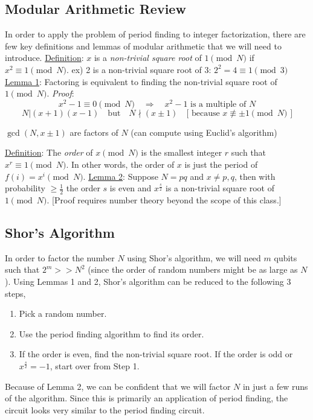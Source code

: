\documentclass[11pt]{article} %
\begin{document}
\subsection{Modular Arithmetic Review}
In order to apply the problem of period finding to integer factorization, there are few key definitions and lemmas of modular arithmetic that we will need to introduce.
\newline\newline
\underline{Definition}: $x$ is a \textit{non-trivial square root} of $1\pmod N$ if $x^2\equiv 1\pmod N$.
\newline 
ex) 2 is a non-trivial square root of 3: $2^2=4\equiv1 \pmod3$
\newline\newline
\underline{Lemma 1}: Factoring is equivalent to finding the non-trivial square root of $1\pmod N$.
\textit{Proof}:
\begin{equation*}
    x^2-1\equiv 0 \pmod N \quad\Rightarrow\quad x^2-1 \text{ is a multiple of } N 
\end{equation*}
\begin{equation*}
    N | (x+1)(x-1) \quad \text{but}\quad N \nmid (x \pm 1) \quad \text{[ because } x\nequiv \pm 1\pmod N\text{ ]}
\end{equation*}
\centerline{$\gcd(N,x \pm 1)$ are factors of $N$ (can compute using Euclid's algorithm)}
\newline\newline
\underline{Definition}: The \textit{order} of $x\pmod N$ is the smallest integer $r$ such that $x^r \equiv 1\pmod N$.
\newline In other words, the order of $x$ is just the period of $f(i)=x^i\pmod N$.
\newline\newline
\underline{Lemma 2}: Suppose $N=pq$ and $x \neq p,q$, then with probability $\geq \frac{1}{2}$ the order $s$ is even and $x^{\frac{s}{2}}$ is a non-trivial square root of $1 \pmod N$. [Proof requires number theory beyond the scope of this class.]

\subsection{Shor's Algorithm}
In order to factor the number $N$ using Shor's algorithm, we will need $m$ qubits such that $2^m >> N^2$ (since the order of random numbers might be as large as $N$). Using Lemmas 1 and 2, Shor's algorithm can be reduced to the following 3 steps,
\begin{enumerate}
    \item Pick a random number.
    \item Use the period finding algorithm to find its order.
    \item If the order is even, find the non-trivial square root. If the order is odd or $x^{\frac{s}{2}}=-1$, start over from Step 1.
\end{enumerate}
Because of Lemma 2, we can be confident that we will factor $N$ in just a few runs of the algorithm. Since this is primarily an application of period finding, the circuit looks very similar to the period finding circuit.
\end{document}
